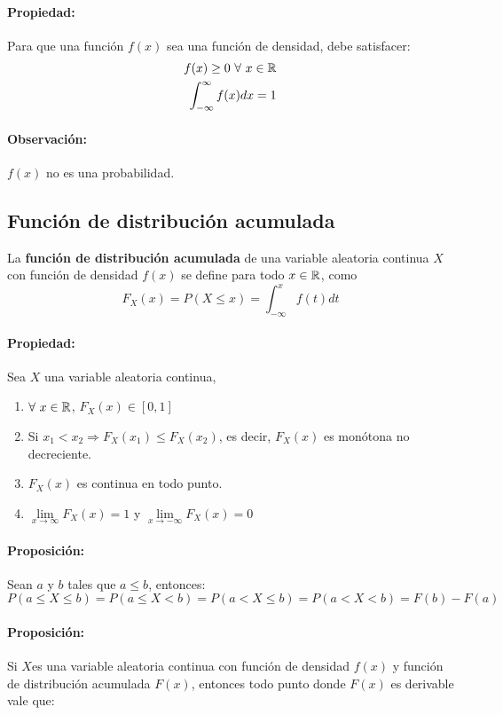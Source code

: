 \paragraph{Propiedad:} Para que una función $f(x)$ sea una función de densidad, debe satisfacer:
\begin{align*}
f(x)\geq 0~\forall~x\in\mathbb{R} \\
\int_{-\infty}^{\infty} f(x)dx = 1
\end{align*}

\paragraph{Observación:} $f(x)$ no es una probabilidad.

\subsection{Función de distribución acumulada}
La \textbf{función de distribución acumulada} de una variable aleatoria continua $X$ con función de densidad $f(x)$ se define para todo $x\in\mathbb{R}$, como
$$F_X(x) = P(X\leq x) = \int_{-\infty}^{x}f(t)dt$$

\paragraph{Propiedad:} Sea $X$ una variable aleatoria continua,
\begin{enumerate}
\item $\forall~x\in\mathbb{R}$, $F_X(x) \in [0,1]$
\item Si $x_1 < x_2\Rightarrow F_X(x_1) \leq F_X(x_2)$, es decir, $F_X(x)$ es monótona no decreciente.
\item $F_X(x)$ es continua en todo punto.
\item $\lim\limits_{x\to\infty} F_X(x) = 1$ y $\lim\limits_{x\to-\infty} F_X(x) = 0$
\end{enumerate}

\paragraph{Proposición:} Sean $a$ y $b$ tales que $a\leq b$, entonces:
$$P(a\leq X\leq b) = P(a\leq X < b) = P(a < X \leq b) = P(a < X < b) = F(b)-F(a) $$

\paragraph{Proposición:} Si $X$es una variable aleatoria continua con función de densidad $f(x)$ y función de distribución acumulada $F(x)$, entonces todo punto donde $F(x)$ es derivable vale que:


